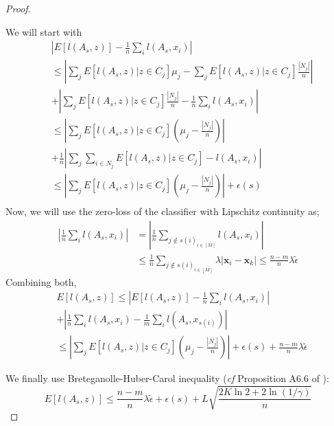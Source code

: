 \documentclass{article}
\begin{document}
\begin{proof}
\begin{small}
We will start with
\[
\begin{aligned}
&\left|E[l(A_s,z)] - \frac{1}{n}\sum_i l(A_s,x_i) \right| \\
&\leq \left|\sum_{j} E[l(A_s,z)|z \in C_j] \mu_{j} -  \sum_{j} E[l(A_s,z)|z \in C_j] \frac{|N_j|}{n} \right| \\
 &+  \left|\sum_{j} E[l(A_s,z)|z \in C_j] \frac{|N_j|}{n}  - \frac{1}{n}\sum_i l(A_s,x_i)\right| \\
  &\leq\left|\sum_{j} E[l(A_s,z)|z \in C_j] (\mu_{j} -   \frac{|N_j|}{n}) \right|\\
 &+\frac{1}{n} \left|\sum_j \sum_{i \in N_j} E[l(A_s,z)|z \in C_j]  - l(A_s,x_i)\right| \\
   &\leq \left|\sum_{j} E[l(A_s,z)|z \in C_j] (\mu_{j} -   \frac{|N_j|}{n})\right| +\epsilon(s)  \\
 \end{aligned}
\]
Now, we will use the zero-loss of the classifier with Lipschitz continuity as;
\[
\begin{aligned}
\left|\frac{1}{n}\sum_i l(A_s,x_i) \right| &= \left|\frac{1}{n}\sum_{j \notin {s(i)}_{i\in [M]}} l(A_s,x_i)  \right| \\
&\leq  \frac{1}{n}\sum_{j \notin {s(i)}_{i\in [M]}} \lambda  \left| \mathbf{x}_i - \mathbf{x}_k\right | \leq \frac{n-m}{n} \lambda \tilde{\epsilon}
\end{aligned}
\]
Combining both,
\[
\begin{aligned}
&E[l(A_s,z)] \leq  \left|E[l(A_s,z)] - \frac{1}{n}\sum_i l(A_s,x_i) \right|  \\ &+ \left|\frac{1}{n}\sum_i l(A_s,x_i) - \frac{1}{m}\sum_i l(A_s,x_{s(i)}) \right| \\
&\leq \left|\sum_{j} E[l(A_s,z)|z \in C_j] (\mu_{j} -   \frac{|N_j|}{n})\right| +\epsilon(s) + \frac{n-m}{n} \lambda \tilde{\epsilon}
\end{aligned}
\]
\end{small}
We finally use Breteganolle-Huber-Carol inequality (\emph{cf} Proposition A6.6 of \cite{wellner}):
\[
E[l(A_s,z)] \leq \frac{n-m}{n} \lambda \tilde{\epsilon} + \epsilon(s) + L \sqrt{\frac{2K\ln 2 + 2\ln (1/\gamma)}{n}}
\]
\end{proof}
\end{document}
